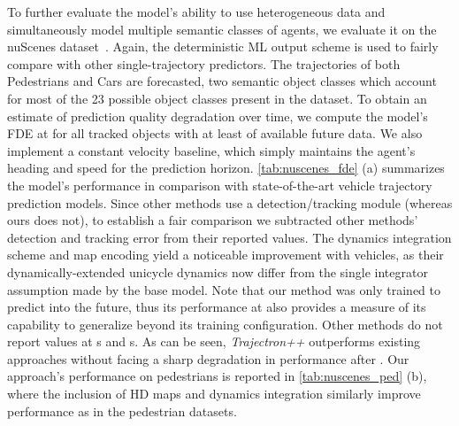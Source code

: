 \documentclass[runningheads]{llncs}
\newcommand{\algname}{\mbox{Trajectron++}}
\newcommand{\emphalgname}{\emph{\algname}}
\begin{document}
To further evaluate the model's ability to use heterogeneous data and simultaneously model multiple semantic classes of agents, we evaluate it on the nuScenes dataset~\cite{CaesarBankitiEtAl2019}. Again, the deterministic ML output scheme is used to fairly compare with other single-trajectory predictors.
The trajectories of both Pedestrians and Cars are forecasted, two semantic object classes which 
account for most of the 23 possible object classes present in the dataset. To obtain an estimate of prediction quality degradation over time, we compute the model's FDE at  for all tracked objects with at least  of available future data. We also implement a constant velocity baseline, which simply maintains the agent's heading and speed for the prediction horizon. \cref{tab:nuscenes_fde} (a) summarizes the model's performance in comparison with state-of-the-art vehicle trajectory prediction models. Since other methods use a detection/tracking module (whereas ours does not), to establish a fair comparison we subtracted other methods' detection and tracking error from their reported values.
The dynamics integration scheme and map encoding yield a noticeable improvement with vehicles, as their dynamically-extended unicycle dynamics now differ from the single integrator assumption made by the base model.
Note that our method was only trained to predict  into the future, thus its performance at  also provides a measure of its capability to generalize beyond its training configuration. Other methods do not report values at s and s. As can be seen, \emphalgname{} outperforms existing approaches without facing a sharp degradation in performance after .
Our approach's performance on pedestrians is reported in \cref{tab:nuscenes_ped} (b), where the inclusion of HD maps and dynamics integration similarly improve performance as in the pedestrian datasets.
\end{document}
